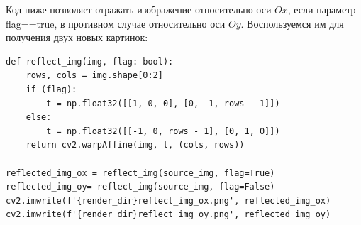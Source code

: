 \documentclass[a4paper, 16pt]{article}
\begin{document}
\noindent Код ниже позволяет отражать изображение относительно оси $Ox$, если
параметр flag==true, в противном случае относительно оси $Oy$. Воспользуемся им для
получения двух новых картинок:
\begin{lstlisting}[label=reflect-code,caption=Код для отражения относительно оси $Ox \text{ или } Oy$]
def reflect_img(img, flag: bool):
    rows, cols = img.shape[0:2]
    if (flag):
        t = np.float32([[1, 0, 0], [0, -1, rows - 1]])
    else:
        t = np.float32([[-1, 0, rows - 1], [0, 1, 0]])
    return cv2.warpAffine(img, t, (cols, rows))

reflected_img_ox = reflect_img(source_img, flag=True)
reflected_img_oy= reflect_img(source_img, flag=False)
cv2.imwrite(f'{render_dir}reflect_img_ox.png', reflected_img_ox)
cv2.imwrite(f'{render_dir}reflect_img_oy.png', reflected_img_oy)
\end{lstlisting}
\end{document}
